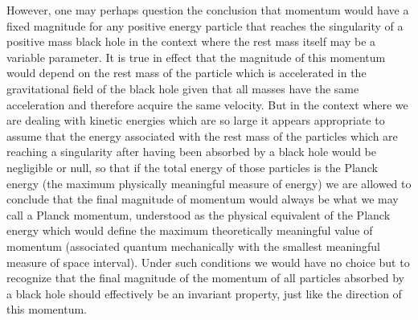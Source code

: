 \documentclass[notitlepage,12pt]{report}
\begin{document}
However, one may perhaps question the conclusion that momentum would have a fixed magnitude for any positive energy particle that reaches the singularity of a positive mass black hole in the context where the rest mass itself may be a variable parameter. It is true in effect that the magnitude of this momentum would depend on the rest mass of the particle which is accelerated in the gravitational field of the black hole given that all masses have the same acceleration and therefore acquire the same velocity. But in the context where we are dealing with kinetic energies which are so large it appears appropriate to assume that the energy associated with the rest mass of the particles which are reaching a singularity after having been absorbed by a black hole would be negligible or null, so that if the total energy of those particles is the Planck energy (the maximum physically meaningful measure of energy) we are allowed to conclude that the final magnitude of momentum would always be what we may call a Planck momentum, understood as the physical equivalent of the Planck energy which would define the maximum theoretically meaningful value of momentum (associated quantum mechanically with the smallest meaningful measure of space interval). Under such conditions we would have no choice but to recognize that the final magnitude of the momentum of all particles absorbed by a black hole should effectively be an invariant property, just like the direction of this momentum.
\end{document}
